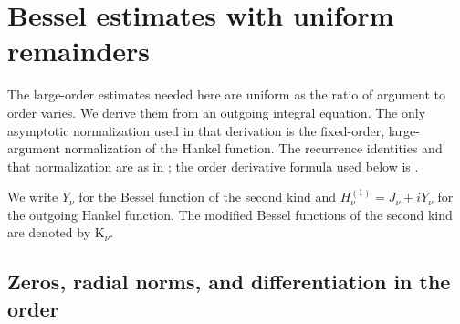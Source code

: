 \section{Bessel estimates with uniform remainders}\label{inf:sec-bessel}

The large-order estimates needed here are uniform as the ratio of
argument to order varies. We derive them from an outgoing integral
equation. The only asymptotic normalization used in that derivation is
the fixed-order, large-argument normalization of the Hankel function.
The recurrence identities and that normalization are as in
\cite[\S\S10.6, 10.17]{inf:dlmf}; the order derivative formula used
below is \cite[Eq.~10.21.17]{inf:dlmf}.

We write $Y_\nu$ for the Bessel function of the second kind and
$H^{(1)}_\nu=J_\nu+iY_\nu$ for the outgoing Hankel function.
The modified Bessel functions of the second kind are denoted by
$\mathrm K_\nu$.

\subsection{Zeros, radial norms, and differentiation in the order}

